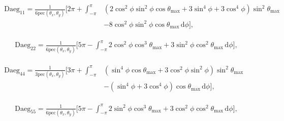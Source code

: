 \documentclass[a4paper,11pt,twoside,openright]{book}
\providecommand{\pec}{{\mathrm{pec}}}%
\def\lthtmlcheckvsize{\ifdim\ht\sizebox<\vsize 
  \ifdim\wd\sizebox<\hsize\expandafter\hfill\fi \expandafter\vfill
  \else\expandafter\vss\fi}%
\begin{document}
{\newpage\clearpage
\setcounter{equation}{58}
%
\begin{subequations}\begin{flalign}
\begin{split}
\textrm{Daeg}_{11} = \frac{1}{6\pec (\theta_x , \theta_y )} \Bigg[
2\pi +
\int_{-\pi}^{\pi}
& \left( 2\cos^2\phi \sin^2\phi \cos\theta_{\textrm{max}}+ 3\sin^4\phi + 3\cos^4\phi \right) \sin^2\theta_{\textrm{max}}\\
& - 8\cos^2\phi \sin^2\phi \cos\theta_{\textrm{max}}
\,\mathrm{d}\phi
\Bigg] ,
\end{split} &
\end{flalign}\end{subequations}%
\lthtmldisplayZ
\lthtmlcheckvsize\clearpage}

{\newpage\clearpage
\setcounter{equation}{58}
%
\begin{subequations}\begin{flalign}
&\textrm{Daeg}_{22} = \frac{1}{6\pec (\theta_x , \theta_y )} \Bigg[
5\pi -
\int_{-\pi}^{\pi}
2\cos^2\phi \cos^3\theta_{\textrm{max}}+ 3\sin^2\phi \cos^2\theta_{\textrm{max}}
\,\mathrm{d}\phi
\Bigg] , &
\end{flalign}\end{subequations}%
\lthtmldisplayZ
\lthtmlcheckvsize\clearpage}

{\newpage\clearpage
\setcounter{equation}{58}
%
\begin{subequations}\begin{flalign}
\begin{split}
\textrm{Daeg}_{44} = \frac{1}{3\pec (\theta_x , \theta_y )} \Bigg[
3\pi +
\int_{-\pi}^{\pi}
& \left( \sin^4\phi \cos\theta_{\textrm{max}}+ 3\cos^2\phi \sin^2\phi \right) \sin^2\theta_{\textrm{max}}\\
& - \left( \sin^4\phi + 3\cos^4\phi \right) \cos\theta_{\textrm{max}}
\,\mathrm{d}\phi
\Bigg] ,
\end{split} &
\end{flalign}\end{subequations}%
\lthtmldisplayZ
\lthtmlcheckvsize\clearpage}

{\newpage\clearpage
\setcounter{equation}{58}
%
\begin{subequations}\begin{flalign}
&\textrm{Daeg}_{55} = \frac{1}{6\pec (\theta_x , \theta_y )} \Bigg[
5\pi -
\int_{-\pi}^{\pi}
2\sin^2\phi \cos^3\theta_{\textrm{max}}+ 3\cos^2\phi \cos^2\theta_{\textrm{max}}
\,\mathrm{d}\phi
\Bigg] , &
\end{flalign}\end{subequations}%
\lthtmldisplayZ
\lthtmlcheckvsize\clearpage}
\end{document}
